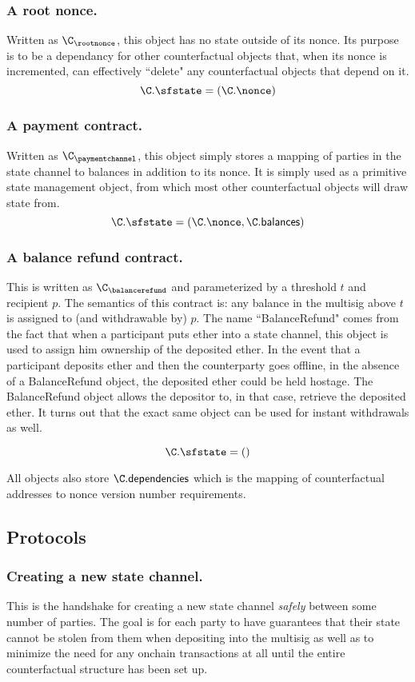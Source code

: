 \documentclass[prb,floatfix,reprint,nofootinbib,amsmath,amssymb,epsfig,pre,floats,letterpaper,groupedaffiliation,tightenlines,allcolors=blue,11pt]{revtex4}
\theoremstyle{definition}
\theoremstyle{definition}
\theoremstyle{definition}
\begin{document}
\subsubsection{A root nonce.} Written as $\C_\rootnonce$, this object has no state outside of its nonce. Its purpose is to be a dependancy for other counterfactual objects that, when its nonce is incremented, can effectively ``delete" any counterfactual objects that depend on it.
\[ \C.\sfstate = (\C.\nonce) \]
\subsubsection{A payment contract.} Written as $\C_\paymentchannel$, this object simply stores a mapping of parties in the state channel to balances in addition to its nonce. It is simply used as a primitive state management object, from which most other counterfactual objects will draw state from.
\[ \C.\sfstate = (\C.\nonce, \C.\textsf{balances}) \]
\subsubsection{A balance refund contract.} This is written as $\C_\balancerefund$ and parameterized by a threshold $t$ and recipient $p$. The semantics of this contract is: any balance in the multisig above $t$ is assigned to (and withdrawable by) $p$. The name ``BalanceRefund" comes from the fact that when a participant puts ether into a state channel, this object is used to assign him ownership of the deposited ether. In the event that a participant deposits ether and then the counterparty goes offline, in the absence of a BalanceRefund object, the deposited ether could be held hostage. The BalanceRefund object allows the depositor to, in that case, retrieve the deposited ether. It turns out that the exact same object can be used for instant withdrawals as well.

\[ \C.\sfstate = () \]

All objects also store $\C.\textsf{dependencies}$ which is the mapping of counterfactual addresses to nonce version number requirements.

\subsection{Protocols}


\subsubsection{Creating a new state channel.} This is the handshake for creating a new state channel \textit{safely} between some number of parties. The goal is for each party to have guarantees that their state cannot be stolen from them when depositing into the multisig as well as to minimize the need for any onchain transactions at all until the entire counterfactual structure has been set up.
\end{document}
